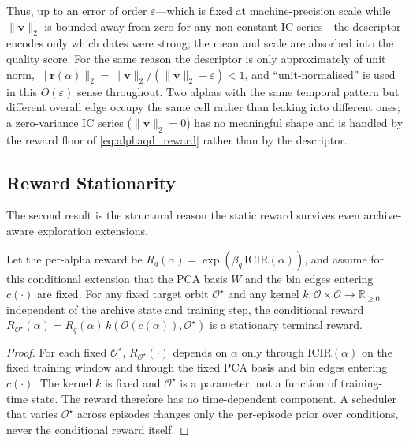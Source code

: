 Thus, up to an error of order $\varepsilon$---which is fixed at machine-precision scale while $\|\mathbf{v}\|_2$ is bounded away from zero for any non-constant IC series---the descriptor encodes only which dates were strong; the mean and scale are absorbed into the quality score. For the same reason the descriptor is only approximately of unit norm, $\|\mathbf{r}(\alpha)\|_2=\|\mathbf{v}\|_2/(\|\mathbf{v}\|_2+\varepsilon)<1$, and ``unit-normalised'' is used in this $O(\varepsilon)$ sense throughout. Two alphas with the same temporal pattern but different overall edge occupy the same cell rather than leaking into different ones; a zero-variance IC series ($\|\mathbf{v}\|_2=0$) has no meaningful shape and is handled by the reward floor of \eqref{eq:alphaqd_reward} rather than by the descriptor.

\subsection{Reward Stationarity}
\label{sec:alphaqd_stationary}

The second result is the structural reason the static reward survives even archive-aware exploration extensions.

\begin{theorem}
\label{thm:alphaqd_stationary}
Let the per-alpha reward be $R_q(\alpha)=\exp(\beta_q\,\mathrm{ICIR}(\alpha))$, and assume for this conditional extension that the PCA basis $W$ and the bin edges entering $c(\cdot)$ are fixed. For any fixed target orbit $\mathcal{O}^\star$ and any kernel $k:\mathcal{O}\times\mathcal{O}\to\mathbb{R}_{\ge 0}$ independent of the archive state and training step, the conditional reward $R_{\mathcal{O}^\star}(\alpha)=R_q(\alpha)\,k(\mathcal{O}(c(\alpha)),\mathcal{O}^\star)$ is a stationary terminal reward.
\end{theorem}
\begin{proof}
For each fixed $\mathcal{O}^\star$, $R_{\mathcal{O}^\star}(\cdot)$ depends on $\alpha$ only through $\mathrm{ICIR}(\alpha)$ on the fixed training window and through the fixed PCA basis and bin edges entering $c(\cdot)$. The kernel $k$ is fixed and $\mathcal{O}^\star$ is a parameter, not a function of training-time state. The reward therefore has no time-dependent component. A scheduler that varies $\mathcal{O}^\star$ across episodes changes only the per-episode prior over conditions, never the conditional reward itself.
\end{proof}

